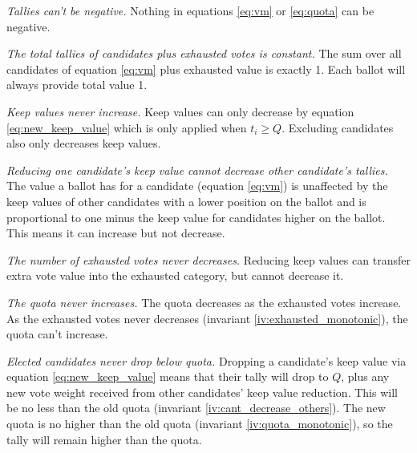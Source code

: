 \documentclass{article}
\begin{document}
\begin{invariant}\label{iv:nonnegative}
    \emph{Tallies can't be negative.} Nothing in equations \ref{eq:vm} or \ref{eq:quota}
    can be negative.
\end{invariant}   

\begin{invariant}\label{iv:const_sum}
    \emph{The total tallies of candidates plus exhausted votes is constant.} The sum
    over all candidates of equation \ref{eq:vm} plus exhausted value is exactly 1. Each
    ballot will always provide total value 1.
\end{invariant}   

\begin{invariant}\label{iv:keep_never_inc}
    \emph{Keep values never increase.} Keep values can only decrease by equation \ref{eq:new_keep_value} which is only applied when $t_i\geq Q$. Excluding candidates also
    only decreases keep values.
\end{invariant}   

\begin{invariant}\label{iv:cant_decrease_others}
    \emph{Reducing one candidate's keep value cannot decrease other candidate's tallies.}
    The value a ballot has for a candidate (equation \ref{eq:vm}) 
    is unaffected by the keep values of other
    candidates with a lower position on the ballot and is proportional to one minus the
    keep value for candidates higher on the ballot. This means it can increase but not
    decrease.
\end{invariant}   

\begin{invariant}\label{iv:exhausted_monotonic}
    \emph{The number of exhausted votes never decreases.} Reducing keep values can
    transfer extra vote value into the exhausted category, but cannot decrease it.
\end{invariant}   

\begin{invariant}\label{iv:quota_monotonic}
    \emph{The quota never increases.} The quota decreases as the exhausted votes increase.
    As the exhausted votes never decreases (invariant \ref{iv:exhausted_monotonic}), the quota can't increase.
\end{invariant}   

\begin{invariant}\label{iv:elected_geq_quota}
    \emph{Elected candidates never drop below quota.} Dropping a candidate's keep value
    via equation \ref{eq:new_keep_value} means that their tally will drop to $Q$,
    plus any new vote weight received from other candidates' keep value reduction.
    This will be no less than the old quota (invariant \ref{iv:cant_decrease_others}). The new quota is no higher than the
    old quota (invariant \ref{iv:quota_monotonic}), so the tally will remain higher than the quota.
\end{invariant}   
\end{document}
